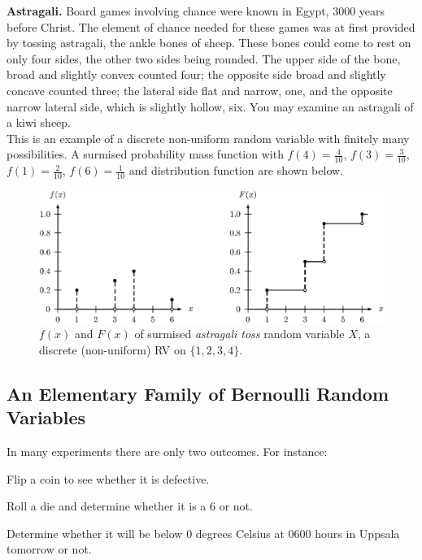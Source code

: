 \begin{example}\label{Eg:Astragali}
{\bf Astragali.} Board games involving chance
  were known in Egypt, 3000 years before Christ. The element of chance
  needed for these games was at first provided by tossing astragali, the
  ankle bones of sheep. These bones could come to rest on only four
  sides, the other two sides being rounded. The upper side of the bone,
  broad and slightly convex counted four; the opposite side broad and
  slightly concave counted three; the lateral side flat and narrow, one,
  and the opposite narrow lateral side, which is slightly hollow, six.
  You may examine an astragali of a kiwi sheep. \\[6pt] This is an example of a discrete
  non-uniform random variable with finitely many possibilities.  A surmised probability mass function with $f(4)=\frac{4}{10}$,
  $f(3)=\frac{3}{10}$, $f(1)=\frac{2}{10}$, $f(6)=\frac{1}{10}$ and
  distribution function are shown below.

\begin{figure}[htbp]
\begin{center}
\includegraphics{pstricks/astragalifF}
\caption{$f(x)$ and $F(x)$ of surmised {\em astragali toss} random variable $X$, a discrete (non-uniform) RV on $\{1,2,3,4\}$.}
\end{center}
\end{figure}
\end{example}

\subsection{An Elementary Family of Bernoulli Random Variables}\label{S:ElemDiscRV}
In many experiments there are only two outcomes. For instance:

\bit
\item Flip a coin to see whether it is defective.
\item  Roll a die and determine whether it is a 6 or not.
\item  Determine whether it will be below $0$ degrees Celsius at 0600 hours in Uppsala tomorrow or not.
\eit

